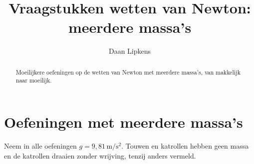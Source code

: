 \documentclass{ximera}
\title{Vraagstukken wetten van Newton: meerdere massa's}
\author{Daan Lipkens}
\begin{document}
\begin{abstract}
    Moeilijkere oefeningen op de wetten van Newton met meerdere massa's, van makkelijk naar moeilijk.
\end{abstract}
\maketitle
\section{Oefeningen met meerdere massa's}

Neem in alle oefeningen $g = 9{,}81 \, \mathrm{m/s^2}$. Touwen en katrollen hebben geen massa en de katrollen draaien zonder wrijving, tenzij anders vermeld.

\end{document}
